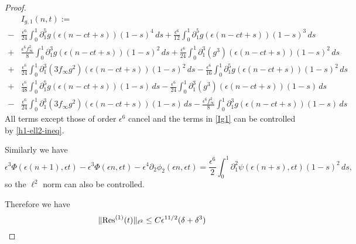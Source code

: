 \begin{proof}
\begin{equation}
\begin{aligned}
		&I_{g,1}(n,t) := \\
		-&\frac{\epsilon^6} {24} \int_0^1 \partial_1^5 g(\epsilon(n - ct + s)) (1-s)^4 \, ds +\frac{\epsilon^6} {12} \int_0^1 \partial_1^5 g(\epsilon(n - ct + s)) (1-s)^3 \, ds \\
		+&\frac{\epsilon^6 f_\infty^2} 8 \int_0^1 \partial_1^3 g(\epsilon(n - ct + s)) (1-s)^2 \, ds +\frac{\epsilon^6} {24} \int_0^1 \partial_1^3(g^3)(\epsilon(n - ct + s)) (1-s)^2 \, ds \\
		+&\frac{\epsilon^6} {24} \int_0^1 \partial_1^3(3f_\infty g^2)(\epsilon(n - ct + s)) (1-s)^2 \, ds - \frac{\epsilon^6} {16} \int_0^1 \partial_1^5g(\epsilon(n - ct + s)) (1-s)^2 \, ds \\
		+ & \frac{\epsilon^6}{48}\int_0^1 \partial_1^5 g(\epsilon(n-ct+s))(1-s)\, ds -  \frac{\epsilon^6}{24} \int_0^1 \partial_1^3(g^3)(\epsilon(n-ct+s))(1-s)\, ds \\
		- & \frac{\epsilon^6}{24} \int_0^1 \partial_1^3(3f_\infty g^2)(\epsilon(n-ct+s))(1-s)\, ds - \frac{\epsilon^6f_\infty ^2}{8} \int_0^1 \partial_1^3 g(\epsilon(n-ct+s)) (1-s) \, ds
	\end{aligned}
	\end{equation}
	All terms except those of order \(\epsilon^6\) cancel and the terms in \cref{Ig1} can be controlled by \cref{h1-ell2-ineq}. 

	
	Similarly we have
	\begin{equation*}
		\epsilon^3 \Phi(\epsilon(n+1), \epsilon t) - \epsilon^3\Phi(\epsilon n , \epsilon t) - \epsilon^4 \partial_2 \phi_2(\epsilon n, \epsilon t) =  \frac{\epsilon^6} 2 \int_0^1 \partial_1^2 \psi(\epsilon(n+s),\epsilon t)(1-s)^2\, ds,
	\end{equation*}
    so the \(\ell^2\) norm can also be controlled.
	
	Therefore we have 
	\begin{equation*}
		\| \mathrm{Res}^{(1)}(t) \|_{\ell^2} \leq C \epsilon^{11/2}(\delta + \delta^3)
	\end{equation*}


\end{proof}
